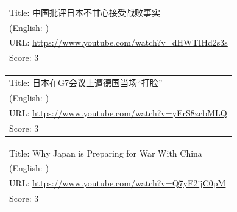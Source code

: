 \documentclass{article}
\begin{document}
\noindent
\begin{tabular}{p{}}
Title: 中国批评日本不甘心接受战败事实 \\
(English: ) \\
URL: \url{https://www.youtube.com/watch?v=dHWTIHd2s3s} \\
Score: 3 \\
\end{tabular}
\vspace{0.5em}

\noindent
\begin{tabular}{p{}}
Title: 日本在G7会议上遭德国当场“打脸” \\
(English: ) \\
URL: \url{https://www.youtube.com/watch?v=yErS8zcbMLQ} \\
Score: 3 \\
\end{tabular}
\vspace{0.5em}

\noindent
\begin{tabular}{p{}}
Title: Why Japan is Preparing for War With China \\
(English: ) \\
URL: \url{https://www.youtube.com/watch?v=Q7yE2ijC0pM} \\
Score: 3 \\
\end{tabular}
\vspace{0.5em}
\end{document}
